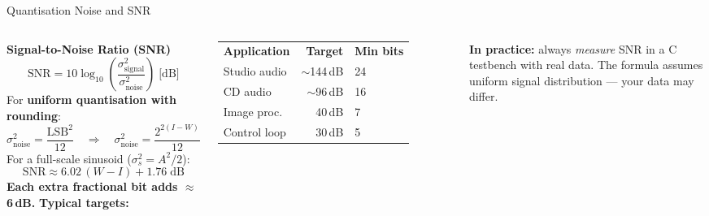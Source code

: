 \documentclass[aspectratio=169,12pt]{beamer}
\begin{document}
\begin{frame}[t]{Quantisation Noise and SNR}
\vspace{0.04cm}
\setlength{\abovedisplayskip}{2pt}\setlength{\belowdisplayskip}{2pt}%
\begin{columns}[T,totalwidth=\textwidth]
  \vspace{0.02cm}
  {\color{Navy}\bfseries Signal-to-Noise Ratio (SNR)}
  \[
    \text{SNR} = 10\log_{10}\!\left(\frac{\sigma^2_{\text{signal}}}{\sigma^2_{\text{noise}}}\right) \;\text{[dB]}
  \]
  For \textbf{uniform quantisation with rounding}:
  \[
    \sigma^2_{\text{noise}} = \frac{\text{LSB}^2}{12}
    \quad\Rightarrow\quad
    \sigma^2_{\text{noise}} = \frac{2^{2(I-W)}}{12}
  \]
  For a full-scale sinusoid ($\sigma^2_s = A^2/2$):
  \[
    \text{SNR} \approx 6.02\,(W - I) + 1.76\;\text{dB}
  \]
  {\small\color{Orange}\bfseries Each extra fractional bit adds $\approx$6\,dB.}
  \vspace{0.02cm}
  {\color{Navy}\bfseries Typical targets:}
  \vspace{1pt}
  {\setlength{\extrarowheight}{0pt}
  \begin{tabular}{lrl}
  \rowcolor{Navy!15}
  \textbf{Application} & \textbf{Target} & \textbf{Min bits}\\
  Studio audio  & $\sim$144\,dB & 24\\
  CD audio      & $\sim$96\,dB  & 16\\
  Image proc.\  & 40\,dB        & 7\\
  Control loop  & 30\,dB        & 5\\
  \end{tabular}}
  \vspace{0.02cm}
  \colorbox{Teal!12}{\parbox{\dimexpr\linewidth-2\fboxsep\relax}{%
    \vspace{1pt}
    {\footnotesize\color{NavyDk}
      \textbf{In practice:} always \emph{measure} SNR
      in a C testbench with real data.
      The formula assumes uniform signal
      distribution --- your data may differ.}
    \vspace{1pt}
  }}
\end{columns}
\end{frame}
\end{document}
